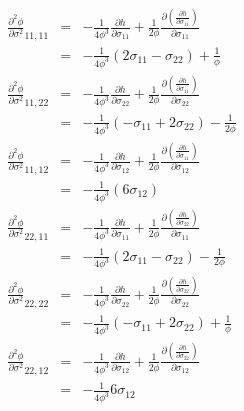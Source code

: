 \documentclass[12pt]{amsart}
\begin{document}
\begin{eqnarray}
  \label{eq:d2phi_vm}
  \frac{\partial^2\phi}{\partial\sigma^2}_{11,11}&=& - \frac{1}{4\phi^3} \frac{\partial h}{\partial\sigma_{11}}  + \frac{1}{2\phi}  \frac{\partial(  \frac{\partial h}{\partial \sigma_{11}}   )}{\partial\sigma_{11}} \\
                                                &=& - \frac{1}{4\phi^3} (2\sigma_{11}-\sigma_{22})              + \frac{1}{\phi}  \nonumber\\
  \frac{\partial^2\phi}{\partial\sigma^2}_{11,22}&=& - \frac{1}{4\phi^3} \frac{\partial h}{\partial\sigma_{22}}  + \frac{1}{2\phi}  \frac{\partial(  \frac{\partial h}{\partial \sigma_{11}}   )}{\partial\sigma_{22}} \\
                                                &=& - \frac{1}{4\phi^3} (-\sigma_{11}+2\sigma_{22})             - \frac{1}{2\phi}    \nonumber \\
  \frac{\partial^2\phi}{\partial\sigma^2}_{11,12}&=& - \frac{1}{4\phi^3} \frac{\partial h}{\partial\sigma_{12}}  + \frac{1}{2\phi}  \frac{\partial(  \frac{\partial h}{\partial \sigma_{11}}   )}{\partial\sigma_{12}} \\
                                                &=& - \frac{1}{4\phi^3} (6\sigma_{12}) \nonumber\\
  \frac{\partial^2\phi}{\partial\sigma^2}_{22,11}&=& - \frac{1}{4\phi^3} \frac{\partial h}{\partial\sigma_{11}}  + \frac{1}{2\phi}  \frac{\partial(  \frac{\partial h}{\partial \sigma_{22}}   )}{\partial\sigma_{11}} \\
                                                &=& - \frac{1}{4\phi^3} (2\sigma_{11}-\sigma_{22})              -  \frac{1}{2\phi}\nonumber \\
  \frac{\partial^2\phi}{\partial\sigma^2}_{22,22}&=& - \frac{1}{4\phi^3} \frac{\partial h}{\partial\sigma_{22}}  + \frac{1}{2\phi}  \frac{\partial(  \frac{\partial h}{\partial \sigma_{22}}   )}{\partial\sigma_{22}} \\
                                                &=& - \frac{1}{4\phi^3} (-\sigma_{11}+2 \sigma_{22})            + \frac{1}{\phi}  \nonumber \\
  \frac{\partial^2\phi}{\partial\sigma^2}_{22,12}&=& - \frac{1}{4\phi^3} \frac{\partial h}{\partial\sigma_{12}}  + \frac{1}{2\phi}  \frac{\partial(  \frac{\partial h}{\partial \sigma_{22}}   )}{\partial\sigma_{12}} \\
                                                &=& - \frac{1}{4\phi^3} 6\sigma_{12}  \nonumber\\

\end{eqnarray}
\end{document}
